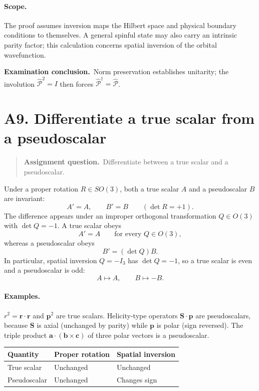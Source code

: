 \documentclass[11pt,a4paper]{article}
\theoremstyle{definition}
\newcommand{\PP}{\hat{\mathcal P}}
\newenvironment{question}{\begin{quote}\small\noindent\textbf{Assignment question.}\ }{\end{quote}}
\newcommand{\exam}[1]{\par\medskip\noindent\textbf{Examination conclusion.}\ #1\par}
\begin{document}
\paragraph{Scope.} The proof assumes inversion maps the Hilbert space and physical boundary conditions to themselves. A general spinful state may also carry an intrinsic parity factor; this calculation concerns spatial inversion of the orbital wavefunction.
\exam{Norm preservation establishes unitarity; the involution $\PP^2=I$ then forces $\PP^\dagger=\PP$.}

\section{A9. Differentiate a true scalar from a pseudoscalar}
\begin{question}Differentiate between a true scalar and a pseudoscalar.\end{question}
Under a proper rotation $R\in SO(3)$, both a true scalar $A$ and a pseudoscalar $B$ are invariant:
\begin{equation}
A'=A,\qquad B'=B\qquad (\det R=+1).
\end{equation}
The difference appears under an improper orthogonal transformation $Q\in O(3)$ with $\det Q=-1$. A true scalar obeys
\begin{equation}
\boxed{A'=A}\qquad\text{for every }Q\in O(3),
\end{equation}
whereas a pseudoscalar obeys
\begin{equation}
\boxed{B'=(\det Q)B}.
\end{equation}
In particular, spatial inversion $Q=-I_3$ has $\det Q=-1$, so a true scalar is even and a pseudoscalar is odd:
\begin{equation}
A\mapsto A,\qquad B\mapsto-B.
\end{equation}
\paragraph{Examples.} $r^2=\mathbf r\cdot\mathbf r$ and $\mathbf p^2$ are true scalars. Helicity-type operators $\mathbf S\cdot\mathbf p$ are pseudoscalars, because $\mathbf S$ is axial (unchanged by parity) while $\mathbf p$ is polar (sign reversed). The triple product $\mathbf a\cdot(\mathbf b\times\mathbf c)$ of three polar vectors is a pseudoscalar.
\begin{center}\small\begin{tabular}{@{}lll@{}}\toprule
Quantity & Proper rotation & Spatial inversion\\\midrule
True scalar & Unchanged & Unchanged\\
Pseudoscalar & Unchanged & Changes sign\\\bottomrule
\end{tabular}\end{center}
\end{document}
